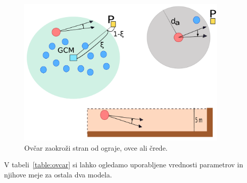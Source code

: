 \begin{figure}[ht]  %
	\centering
	\includegraphics[width=0.9\textwidth]{../poglavja/images/zaokrozi.pdf}
	\caption[Izogibanje ograji, zaokrožanje okrog ovce in okrog črede]{Ovčar zaokroži stran od ograje, ovce ali črede.} %
	\label{fig:zaokrozi}
\end{figure}

V tabeli~\ref{table:ovcar} si lahko ogledamo uporabljene vrednosti parametrov in njihove meje za ostala dva modela.

